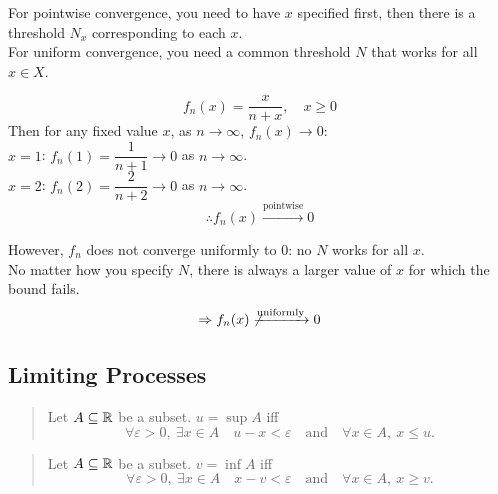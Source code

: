 For pointwise convergence, you need to have $x$ specified first, then there is a threshold $N_x$ corresponding to each $x$.
\\ For uniform convergence, you need a common threshold $N$ that works for all $x \in X$.

\begin{example}
    \[f_n(x) = \frac{x}{n+x}, \quad x\geq 0\]
    Then for any fixed value $x$, as $n\to\infty$, $f_n(x)\to 0$:
    \\ $x=1$: $f_n(1) = \dfrac{1}{n+1} \to 0$ as $n\to\infty$.
    \\ $x=2$: $f_n(2) = \dfrac{2}{n+2} \to 0$ as $n\to\infty$.
    \[\therefore f_n(x) \xrightarrow{\text{pointwise}} 0\]

    However, $f_n$ does not converge uniformly to $0$: no $N$ works for all $x$.
    \\ No matter how you specify $N$, there is always a larger value of $x$ for which the bound fails.
    \[\Rightarrow f_n(x) \not\xrightarrow{\text{uniformly}} 0\]
\end{example}

\subsection{Limiting Processes}

\begin{quote}
    Let $A \subseteq \mathbb{R}$ be a subset. $u = \sup A$ iff
    \[\forall \varepsilon>0,\ \exists x \in A \quad u-x<\varepsilon \quad \text{and} \quad \forall x \in A,\ x \leq u.\]
\end{quote}

\begin{quote}
    Let $A \subseteq \mathbb{R}$ be a subset. $v = \inf A$ iff
    \[\forall \varepsilon>0,\ \exists x \in A \quad x-v<\varepsilon \quad \text{and} \quad \forall x \in A,\ x \geq v.\]
\end{quote}

\begin{center}
\end{center}

